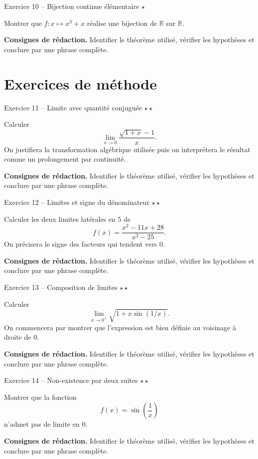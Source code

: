 \documentclass[11pt,a4paper]{article}
\newcommand{\etoiles}[1]{\hfill\textcolor{orangeprepa}{\textbf{#1}}}
\newcommand{\R}{\mathbb{R}}
\begin{document}
\begin{exobox}{Exercice 10 -- Bijection continue élémentaire \etoiles{$\star$}}

Montrer que $f:x\mapsto x^3+x$ réalise une bijection de $\R$ sur $\R$.

\medskip
\textbf{Consignes de rédaction.} Identifier le théorème utilisé, vérifier les hypothèses et conclure par une phrase complète.
\end{exobox}


\section{Exercices de méthode}
\begin{exobox}{Exercice 11 -- Limite avec quantité conjuguée \etoiles{$\star\star$}}

Calculer
\[
\lim_{x\to0}\frac{\sqrt{1+x}-1}{x}.
\]
On justifiera la transformation algébrique utilisée puis on interprétera le résultat comme un prolongement par continuité.

\medskip
\textbf{Consignes de rédaction.} Identifier le théorème utilisé, vérifier les hypothèses et conclure par une phrase complète.
\end{exobox}


\begin{exobox}{Exercice 12 -- Limites et signe du dénominateur \etoiles{$\star\star$}}

Calculer les deux limites latérales en $5$ de
\[
f(x)=\frac{x^2-11x+28}{x^2-25}.
\]
On précisera le signe des facteurs qui tendent vers $0$.

\medskip
\textbf{Consignes de rédaction.} Identifier le théorème utilisé, vérifier les hypothèses et conclure par une phrase complète.
\end{exobox}


\begin{exobox}{Exercice 13 -- Composition de limites \etoiles{$\star\star$}}

Calculer
\[
\lim_{x\to0^+}\sqrt{1+x\sin(1/x)}.
\]
On commencera par montrer que l'expression est bien définie au voisinage à droite de $0$.

\medskip
\textbf{Consignes de rédaction.} Identifier le théorème utilisé, vérifier les hypothèses et conclure par une phrase complète.
\end{exobox}


\begin{exobox}{Exercice 14 -- Non-existence par deux suites \etoiles{$\star\star$}}

Montrer que la fonction
\[
f(x)=\sin\left(\frac1x\right)
\]
n'admet pas de limite en $0$.

\medskip
\textbf{Consignes de rédaction.} Identifier le théorème utilisé, vérifier les hypothèses et conclure par une phrase complète.
\end{exobox}
\end{document}

